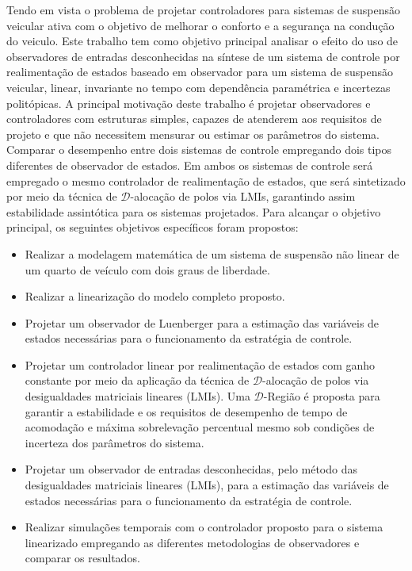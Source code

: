 Tendo em vista o problema de projetar controladores para sistemas de suspensão veicular ativa com o objetivo de melhorar o conforto e a segurança na condução do veiculo. Este trabalho tem como objetivo principal analisar o efeito do uso de observadores de entradas desconhecidas na síntese de um sistema de controle por realimentação de estados baseado em observador para um sistema de suspensão veicular, linear, invariante no tempo com dependência paramétrica e incertezas politópicas.  
A principal motivação deste trabalho é projetar observadores e controladores com estruturas simples, capazes de atenderem aos requisitos de projeto e que não necessitem mensurar ou estimar os parâmetros do sistema. Comparar o desempenho entre dois sistemas de controle empregando dois tipos diferentes de observador de estados. Em ambos os sistemas de controle será empregado o mesmo controlador de realimentação de estados, que será sintetizado por meio da técnica de \( \mathcal{D}\)-alocação de polos via LMIs, garantindo assim estabilidade assintótica para os sistemas projetados.
Para alcançar o objetivo principal, os seguintes objetivos específicos foram propostos:
\begin{itemize}
    \item Realizar a modelagem matemática de um sistema de suspensão não linear de um quarto de veículo com dois graus de liberdade.
    \item Realizar a linearização do modelo completo proposto.
    \item Projetar um observador de Luenberger para a estimação das variáveis de estados necessárias para o funcionamento da estratégia de controle.
    \item Projetar um controlador linear por realimentação de estados com ganho constante por meio da aplicação da técnica de \( \mathcal{D}\)-alocação de polos via desigualdades matriciais lineares (LMIs). Uma \( \mathcal{D}\)-Região é proposta para garantir a estabilidade e os requisitos de desempenho de tempo de acomodação e máxima sobrelevação percentual mesmo sob condições de incerteza dos parâmetros do sistema.
    \item Projetar um observador de entradas desconhecidas, pelo método das desigualdades matriciais lineares (LMIs), para a estimação das variáveis de estados necessárias para o funcionamento da estratégia de controle.
    \item Realizar simulações temporais com o controlador proposto para o sistema linearizado empregando as diferentes metodologias de observadores e comparar os resultados.
\end{itemize}